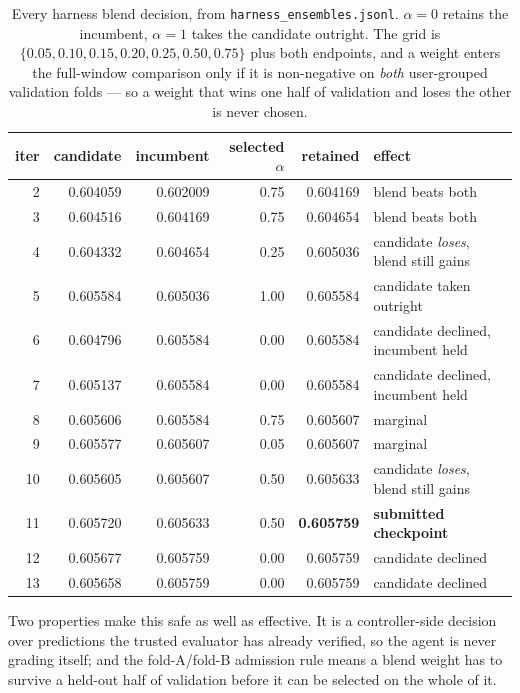 \documentclass[11pt,a4paper]{article}
\newcommand{\file}[1]{\texttt{#1}}
\begin{document}
\begin{table}[htbp]
\centering
\small
\begin{tabular}{@{}rrrrrl@{}}
\toprule
\textbf{iter} & \textbf{candidate} & \textbf{incumbent} & \textbf{selected $\alpha$} &
\textbf{retained} & \textbf{effect} \\
\midrule
 2 & 0.604059 & 0.602009 & 0.75 & 0.604169 & blend beats both \\
 3 & 0.604516 & 0.604169 & 0.75 & 0.604654 & blend beats both \\
 4 & 0.604332 & 0.604654 & 0.25 & 0.605036 & candidate \emph{loses}, blend still gains \\
 5 & 0.605584 & 0.605036 & 1.00 & 0.605584 & candidate taken outright \\
 6 & 0.604796 & 0.605584 & 0.00 & 0.605584 & candidate declined, incumbent held \\
 7 & 0.605137 & 0.605584 & 0.00 & 0.605584 & candidate declined, incumbent held \\
 8 & 0.605606 & 0.605584 & 0.75 & 0.605607 & marginal \\
 9 & 0.605577 & 0.605607 & 0.05 & 0.605607 & marginal \\
10 & 0.605605 & 0.605607 & 0.50 & 0.605633 & candidate \emph{loses}, blend still gains \\
11 & 0.605720 & 0.605633 & 0.50 & \textbf{0.605759} & \textbf{submitted checkpoint} \\
12 & 0.605677 & 0.605759 & 0.00 & 0.605759 & candidate declined \\
13 & 0.605658 & 0.605759 & 0.00 & 0.605759 & candidate declined \\
\bottomrule
\end{tabular}
\caption{Every harness blend decision, from \file{harness\_ensembles.jsonl}. $\alpha = 0$
retains the incumbent, $\alpha = 1$ takes the candidate outright. The grid is
$\{0.05, 0.10, 0.15, 0.20, 0.25, 0.50, 0.75\}$ plus both endpoints, and a weight enters the
full-window comparison only if it is non-negative on \emph{both} user-grouped validation
folds --- so a weight that wins one half of validation and loses the other is never chosen.}
\label{tab:blend}
\end{table}

\noindent
Two properties make this safe as well as effective. It is a controller-side decision over
predictions the trusted evaluator has already verified, so the agent is never grading itself;
and the fold-A/fold-B admission rule means a blend weight has to survive a held-out half of
validation before it can be selected on the whole of it.
\end{document}
